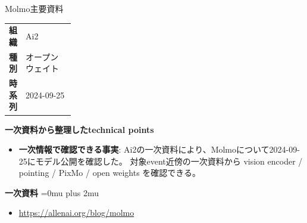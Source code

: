 \begin{technicalnote}{Molmo}{主要資料}
\begingroup
\begin{tabularx}{\linewidth}{@{}>{\bfseries}p{0.22\linewidth}X@{}}
組織 & Ai2 \\
種別 & オープンウェイト \\
時系列 & 2024-09-25 \\
\end{tabularx}
\smallskip
{\bfseries 一次資料から整理したtechnical points}
\begin{itemize}[leftmargin=1.5em,itemsep=0.35em]
\item \textbf{一次情報で確認できる事実}: Ai2の一次資料により、Molmoについて2024-09-25にモデル公開を確認した。 対象event近傍の一次資料から vision encoder / pointing / PixMo / open weights を確認できる。
\end{itemize}
\begin{minipage}{\linewidth}
\begin{samepage}
{\bfseries 一次資料}
\begingroup\sloppy
\Urlmuskip=0mu plus 2mu\relax
\begin{itemize}[leftmargin=1.5em,itemsep=0.25em]
\item {\scriptsize\url{https://allenai.org/blog/molmo}}
\end{itemize}
\endgroup
\end{samepage}
\end{minipage}
\endgroup
\end{technicalnote}
\medskip

